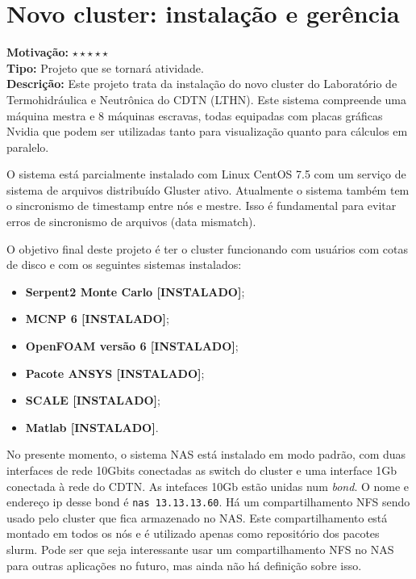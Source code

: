 \chapter{Novo cluster: instalação e gerência}
\label{chap:cluster}

\textbf{Motivação:} $\star\star\star\star\star$\\

\textbf{Tipo:} Projeto que se tornará atividade.\\

\textbf{Descrição:} Este projeto trata da instalação do novo cluster do Laboratório 
de Termohidráulica e Neutrônica do CDTN (LTHN). Este sistema compreende uma máquina mestra e 8 máquinas escravas, todas equipadas com placas gráficas Nvidia que podem ser utilizadas tanto para visualização quanto para cálculos em paralelo.

O sistema está parcialmente instalado com Linux CentOS 7.5 com um serviço de 
sistema de arquivos distribuído Gluster ativo. Atualmente o sistema também tem 
o sincronismo de timestamp entre nós e mestre. Isso é fundamental para evitar 
erros de sincronismo de arquivos (data mismatch).

O objetivo final deste projeto é ter o cluster funcionando com usuários com cotas 
de disco e com os seguintes sistemas instalados:

\begin{itemize}
	\item \textbf{Serpent2 Monte Carlo [INSTALADO]};
	\item \textbf{MCNP 6 [INSTALADO]};
	\item \textbf{OpenFOAM versão 6 [INSTALADO]};
	\item \textbf{Pacote ANSYS [INSTALADO]};
	\item \textbf{SCALE [INSTALADO]};
	\item \textbf{Matlab [INSTALADO]}.
\end{itemize}

No presente momento, o sistema NAS está instalado em modo padrão, com duas 
interfaces de rede 10Gbits conectadas as switch do cluster e uma interface 
1Gb conectada à rede do CDTN. As intefaces 10Gb estão unidas num \textit{bond}. 
O nome e endereço ip desse bond é \texttt{nas 13.13.13.60}. Há um compartilhamento 
NFS sendo usado pelo cluster que fica armazenado no NAS. Este compartilhamento 
está montado em todos os nós e é utilizado apenas como repositório dos pacotes 
slurm. Pode ser que seja interessante usar um compartilhamento NFS no NAS para 
outras aplicações no futuro, mas ainda não há definição sobre isso.

